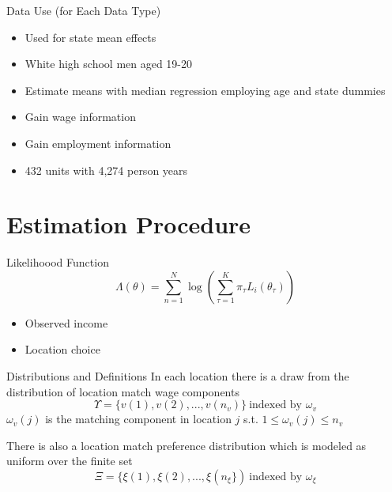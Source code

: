 \documentclass[aspectratio=169,professionalfonts]{beamer}
\begin{document}
\begin{frame}{Data Use (for Each Data Type)}
  \begin{itemize}{PUMS data}
    \item Used for state mean effects
    \item White high school men aged 19-20
    \item Estimate means with median regression employing age and state dummies
  \end{itemize}
  \begin{itemize}{NLSY}
    \item Gain wage information
    \item Gain employment information
    \item 432 units with 4,274 person years
  \end{itemize}
\end{frame}

\section{Estimation Procedure}

\begin{frame}{Likelihoood Function}
  \begin{equation}
    \Lambda(\theta) = \sum\limits_{n=1}^N\log(\sum\limits_{\tau=1}^K\pi_{\tau}L_i(\theta_{\tau}))
  \end{equation}
  \begin{itemize}
    \item Observed income
    \item Location choice
  \end{itemize}
\end{frame}
\begin{frame}{Distributions and Definitions}
  In each location there is a draw from the distribution of location match wage components
  \begin{equation}
    \Upsilon = \{v(1), v(2), ..., v(n_v)\} \ \text{indexed by $\omega_v$}
  \end{equation}
  $\omega_v(j)$ is the matching component in location $j$ s.t. $1\leq\omega_v(j)\leq n_v$

  There is also a location match preference distribution which is modeled as uniform over the finite set
  \begin{equation}
    \Xi = \{\xi(1), \xi(2), ..., \xi(n_{\xi}\}) \ \text{indexed by $\omega_{\xi}$}
  \end{equation}
\end{frame}
\end{document}
